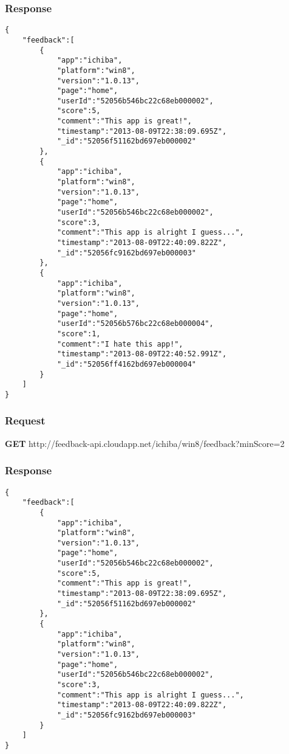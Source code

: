 \subsubsection{Response}
\begin{verbatim}
{
    "feedback":[
        {
            "app":"ichiba",
            "platform":"win8",
            "version":"1.0.13",
            "page":"home",
            "userId":"52056b546bc22c68eb000002",
            "score":5,
            "comment":"This app is great!",
            "timestamp":"2013-08-09T22:38:09.695Z",
            "_id":"52056f51162bd697eb000002"
        },
        {
            "app":"ichiba",
            "platform":"win8",
            "version":"1.0.13",
            "page":"home",
            "userId":"52056b546bc22c68eb000002",
            "score":3,
            "comment":"This app is alright I guess...",
            "timestamp":"2013-08-09T22:40:09.822Z",
            "_id":"52056fc9162bd697eb000003"
        },
        {
            "app":"ichiba",
            "platform":"win8",
            "version":"1.0.13",
            "page":"home",
            "userId":"52056b576bc22c68eb000004",
            "score":1,
            "comment":"I hate this app!",
            "timestamp":"2013-08-09T22:40:52.991Z",
            "_id":"52056ff4162bd697eb000004"
        }
    ]
}
\end{verbatim}

\subsubsection{Request}

\textbf{GET} http://feedback-api.cloudapp.net/ichiba/win8/feedback?minScore=2

\subsubsection{Response}
\begin{verbatim}
{
    "feedback":[
        {
            "app":"ichiba",
            "platform":"win8",
            "version":"1.0.13",
            "page":"home",
            "userId":"52056b546bc22c68eb000002",
            "score":5,
            "comment":"This app is great!",
            "timestamp":"2013-08-09T22:38:09.695Z",
            "_id":"52056f51162bd697eb000002"
        },
        {
            "app":"ichiba",
            "platform":"win8",
            "version":"1.0.13",
            "page":"home",
            "userId":"52056b546bc22c68eb000002",
            "score":3,
            "comment":"This app is alright I guess...",
            "timestamp":"2013-08-09T22:40:09.822Z",
            "_id":"52056fc9162bd697eb000003"
        }
    ]
}
\end{verbatim}

